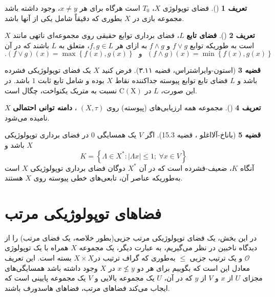\documentclass[12pt,a4paper]{article}
\theoremstyle{definition}
\newtheorem{definition}{تعریف}[section]
\theoremstyle{theorem}
\newtheorem{theorem}[definition]{قضیه}
\theoremstyle{definition}
\newcommand{\cO}{\mathcal{O}}
\begin{document}
\begin{definition}[\cite{G. Gierz}]
فضای توپولوژی 
$ X $،  
$ T_{0} $
است هرگاه برای هر
$ x\neq y $،  وجود داشته باشد مجموعه بازی در
$ X $
 بطوری که دقیقاً شامل یکی از آنها باشد.
\end{definition}
\begin{definition}[\cite{aliprantis}]
\textbf{فضای تابع}
 $ L $،  فضای برداری توابع حقیقی روی مجموعه‌ای ناتهی مانند $ X $ است به طوریکه توابع $ f\vee g  $ و $ f\wedge g $ به ازای هر $ f,g \in L$،   متعلق  به $ L $ باشند که در آن 
$$ .(f\vee g)(x)=\max\left\lbrace f(x),g(x)\right\rbrace    \ \ \     \text{و} \ \ \ (f\wedge g)(x)=\min\left\lbrace f(x),g(x)\right\rbrace $$
\end{definition}
\begin{theorem}[استون-وایراشتراس\cite{aliprantis}،   قضیه ۳.۱۱]
فرض کنید $ X $ یک فضای 
\linebreak
توپولوژیکی فشرده باشد و $ L $ فضای تابع توابع پیوسته جداکننده نقاط $  X$ بوده و شامل تابع ثابت $ 1 $ باشد.  در این صورت،   $  L$ در $ \mathrm{C(X)} $ نسبت به متریک یکنواخت،  چگال است.   
\end{theorem}

\begin{definition}[\cite{Jung and Tix}]
مجموعه همه ارزیابی‌های  (پیوسته)   روی
$ (X,\tau )$%
،  \textbf{دامنه توانی احتمالی}
$ X $
نامیده می‌شود.
\end{definition}

\begin{theorem}[باناخ-آلااغلو \cite{functional}،  قضیه 15.3]
اگر $ V $ یک همسایگی $ 0 $ در فضای برداری توپولوژیکی $ X $ باشد و 
$$K=\left\lbrace \Lambda \in X^{*}:|\Lambda x|\leq 1 ; \ \forall x\in V\right\rbrace $$
آنگاه $ K $،  ضعیف\lr{*}-فشرده است که در آن $ X^{*} $ دوگان فضای برداری توپولوژیکی $ X $ است به‌طوریکه عناصر آن،  تابعی‌های خطی پیوسته روی $  X$ هستند.

\end{theorem}
\section{فضاهای توپولوژیکی مرتب}
در این بخش، یک فضای توپولوژیکی مرتب جزیی(بطور خلاصه، یک فضای مرتب) را از دیدگاه ناخبین در نظر می‌گیریم، به عبارت دیگر، یک مجموعه
 $ X $
 همراه با یک توپولوژی $ \cO $ و یک ترتیب جزیی $ \leq $
    به‌طوری که گراف ترتیب در$ X \times X $    بسته است. این تعریف  معادل این است که بگوییم برای هر دو 
$ x\nleq y $
در
$ X $
وجود داشته باشد همسایگی‌های مجزای 
$ U $
از
$ x $
و
$ V $
از
$ y $
که در آن،  
$ U $
یک مجموعه بالایی و
$ V $
یک مجموعه پایینی است که ایجاب می‌کند فضاهای مرتب،  فضاهای هاسدورف باشند.
\end{document}
